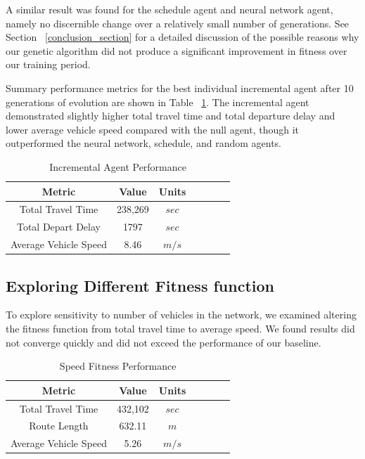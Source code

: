 \documentclass[twocolumn]{article}
\begin{document}
A similar result was found for the schedule agent and neural network agent, namely no discernible change over a relatively small number of generations. See Section ~\ref{conclusion_section} for a detailed discussion of the possible reasons why our genetic algorithm did not produce a significant improvement in fitness over our training period.

Summary performance metrics for the best individual incremental agent after 10 generations of evolution are shown in Table ~\ref{tab:inc_agent_perf}. The incremental agent demonstrated slightly higher total travel time and total departure delay and lower average vehicle speed compared with the null agent, though it outperformed the neural network, schedule, and random agents.

\begin{table}[H]
    \centering
    \begin{tabular}{|c|c|c|c|c|c|c|}
        \hline
         Metric & Value & Units \\
        \hline\hline
        Total Travel Time & 238,269 & $sec$ \\
        \hline
        Total Depart Delay & 1797 & $sec$ \\
        \hline
        Average Vehicle Speed & 8.46 & $m/s$ \\
        \hline
    \end{tabular}
    \caption{Incremental Agent Performance}
    \label{tab:inc_agent_perf}
\end{table}

\subsection{Exploring Different Fitness function} \label{Fitness_Func_subsection}
To explore sensitivity to number of vehicles in the network, we examined altering the fitness function from total travel time to average speed.  We found results did not converge quickly and did not exceed the performance of our baseline.
\begin{table}[H]
    \centering
    \begin{tabular}{|c|c|c|c|c|c|c|}
        \hline
         Metric & Value & Units \\
        \hline\hline
        Total Travel Time & 432,102 & $sec$ \\
        \hline
        Route Length & 632.11 & $m$ \\
        \hline
        Average Vehicle Speed & 5.26 & $m/s$ \\
        \hline
    \end{tabular}
    \caption{Speed Fitness Performance}
    \label{tab:speed_results}
\end{table}
\end{document}
